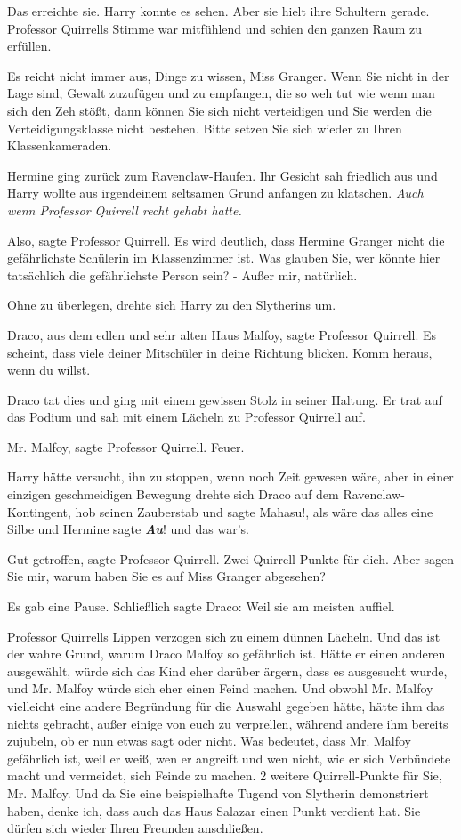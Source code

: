 Das erreichte sie. Harry konnte es sehen. Aber sie hielt ihre Schultern gerade.
Professor Quirrells Stimme war mitfühlend und schien den ganzen Raum zu
erfüllen.

\glqq Es reicht nicht immer aus, Dinge zu wissen, Miss Granger. Wenn Sie nicht
in der Lage sind, Gewalt zuzufügen und zu empfangen, die so weh tut wie wenn man
sich den Zeh stößt, dann können Sie sich nicht verteidigen und Sie werden die
Verteidigungsklasse nicht bestehen. Bitte setzen Sie sich wieder zu Ihren
Klassenkameraden.\grqq{}

Hermine ging zurück zum Ravenclaw-Haufen. Ihr Gesicht sah friedlich aus und
Harry wollte aus irgendeinem seltsamen Grund anfangen zu klatschen. \emph{Auch
wenn Professor Quirrell recht gehabt hatte.}

\glqq Also\grqq{}, sagte Professor Quirrell. \glqq Es wird deutlich, dass
Hermine Granger nicht die gefährlichste Schülerin im Klassenzimmer ist. Was
glauben Sie, wer könnte hier tatsächlich die gefährlichste Person sein? - Außer
mir, natürlich.\grqq{}

Ohne zu überlegen, drehte sich Harry zu den Slytherins um.

\glqq Draco, aus dem edlen und sehr alten Haus Malfoy\grqq{}, sagte Professor
Quirrell. \glqq Es scheint, dass viele deiner Mitschüler in deine Richtung
blicken. Komm heraus, wenn du willst.\grqq{}

Draco tat dies und ging mit einem gewissen Stolz in seiner Haltung. Er trat auf
das Podium und sah mit einem Lächeln zu Professor Quirrell auf.

\glqq Mr. Malfoy\grqq{}, sagte Professor Quirrell. \glqq Feuer.\grqq{}

Harry hätte versucht, ihn zu stoppen, wenn noch Zeit gewesen wäre, aber in einer
einzigen geschmeidigen Bewegung drehte sich Draco auf dem Ravenclaw-Kontingent,
hob seinen Zauberstab und sagte \glqq Mahasu!\grqq{}, als wäre das alles eine
Silbe und Hermine sagte \glqq \textbf{\emph{Au}}!\grqq{} und das war's.

\glqq Gut getroffen\grqq{}, sagte Professor Quirrell. \glqq Zwei Quirrell-Punkte
für dich. Aber sagen Sie mir, warum haben Sie es auf Miss Granger
abgesehen?\grqq{}

Es gab eine Pause. Schließlich sagte Draco: \glqq Weil sie am meisten
auffiel.\grqq{}

Professor Quirrells Lippen verzogen sich zu einem dünnen Lächeln. \glqq Und das
ist der wahre Grund, warum Draco Malfoy so gefährlich ist. Hätte er einen
anderen ausgewählt, würde sich das Kind eher darüber ärgern, dass es ausgesucht
wurde, und Mr. Malfoy würde sich eher einen Feind machen. Und obwohl Mr. Malfoy
vielleicht eine andere Begründung für die Auswahl gegeben hätte, hätte ihm das
nichts gebracht, außer einige von euch zu verprellen, während andere ihm bereits
zujubeln, ob er nun etwas sagt oder nicht. Was bedeutet, dass Mr. Malfoy
gefährlich ist, weil er weiß, wen er angreift und wen nicht, wie er sich
Verbündete macht und vermeidet, sich Feinde zu machen. 2 weitere Quirrell-Punkte
für Sie, Mr. Malfoy. Und da Sie eine beispielhafte Tugend von Slytherin
demonstriert haben, denke ich, dass auch das Haus Salazar einen Punkt verdient
hat. Sie dürfen sich wieder Ihren Freunden anschließen.\grqq{}

